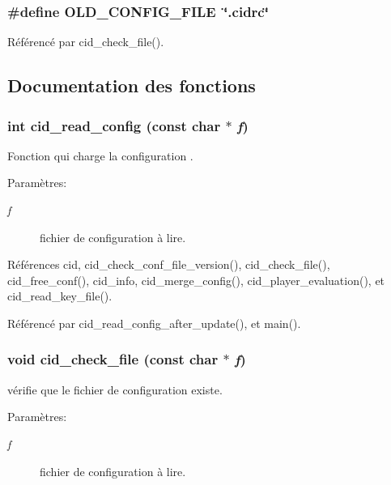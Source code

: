 \subsubsection{\setlength{\rightskip}{0pt plus 5cm}\#define OLD\_\-CONFIG\_\-FILE~\char`\"{}.cidrc\char`\"{}}\label{cid-config_8h_711d201b78f9dcd358d588745928e157}




Référencé par cid\_\-check\_\-file().

\subsection{Documentation des fonctions}
\subsubsection{\setlength{\rightskip}{0pt plus 5cm}int cid\_\-read\_\-config (const char $\ast$ {\em f})}\label{cid-config_8h_76b2b01d2c1cba520d9183fe1ab756bf}


Fonction qui charge la configuration . \begin{Desc}
\item[Paramètres:]
\begin{description}
\item[{\em f}]fichier de configuration à lire. \end{description}
\end{Desc}


Références cid, cid\_\-check\_\-conf\_\-file\_\-version(), cid\_\-check\_\-file(), cid\_\-free\_\-conf(), cid\_\-info, cid\_\-merge\_\-config(), cid\_\-player\_\-evaluation(), et cid\_\-read\_\-key\_\-file().

Référencé par cid\_\-read\_\-config\_\-after\_\-update(), et main().
\subsubsection{\setlength{\rightskip}{0pt plus 5cm}void cid\_\-check\_\-file (const char $\ast$ {\em f})}\label{cid-config_8h_b0fd59c2d29f359e01d9119a71ccc985}


vérifie que le fichier de configuration existe. \begin{Desc}
\item[Paramètres:]
\begin{description}
\item[{\em f}]fichier de configuration à lire. \end{description}
\end{Desc}
